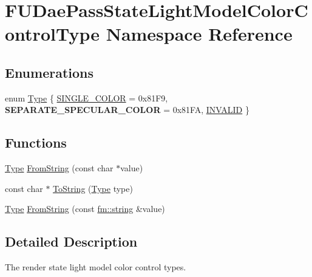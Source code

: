 \hypertarget{namespaceFUDaePassStateLightModelColorControlType}{
\section{FUDaePassStateLightModelColorControlType Namespace Reference}
\label{namespaceFUDaePassStateLightModelColorControlType}
}
\subsection*{Enumerations}
\begin{DoxyCompactItemize}
\item 
enum \hyperlink{namespaceFUDaePassStateLightModelColorControlType_a89d76e5ec7043b932826e01fcecb2ba5}{Type} \{ \hyperlink{namespaceFUDaePassStateLightModelColorControlType_a89d76e5ec7043b932826e01fcecb2ba5a4d8526274376baee897cb8e780bca048}{SINGLE\_\-COLOR} =  0x81F9, 
{\bfseries SEPARATE\_\-SPECULAR\_\-COLOR} =  0x81FA, 
\hyperlink{namespaceFUDaePassStateLightModelColorControlType_a89d76e5ec7043b932826e01fcecb2ba5a102a477682c2e3d7b926a696d5b736fd}{INVALID}
 \}
\end{DoxyCompactItemize}
\subsection*{Functions}
\begin{DoxyCompactItemize}
\item 
\hyperlink{namespaceFUDaePassStateLightModelColorControlType_a89d76e5ec7043b932826e01fcecb2ba5}{Type} \hyperlink{namespaceFUDaePassStateLightModelColorControlType_aa1d179305154010ef29eda30e43c0631}{FromString} (const char $\ast$value)
\item 
const char $\ast$ \hyperlink{namespaceFUDaePassStateLightModelColorControlType_af53db16f1545096ea13e0367efbea1f4}{ToString} (\hyperlink{namespaceFUDaePassStateLightModelColorControlType_a89d76e5ec7043b932826e01fcecb2ba5}{Type} type)
\item 
\hyperlink{namespaceFUDaePassStateLightModelColorControlType_a89d76e5ec7043b932826e01fcecb2ba5}{Type} \hyperlink{namespaceFUDaePassStateLightModelColorControlType_a09b9dcecf42886aa98ac2f785e50f796}{FromString} (const \hyperlink{classfm_1_1stringT}{fm::string} \&value)
\end{DoxyCompactItemize}


\subsection{Detailed Description}
The render state light model color control types. 


